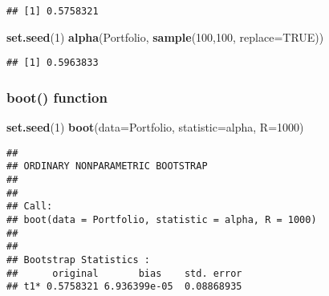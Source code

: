 \documentclass[]{article}
\newenvironment{Shaded}{\begin{snugshade}}{\end{snugshade}}
\newcommand{\KeywordTok}[1]{\textcolor[rgb]{0.13,0.29,0.53}{\textbf{#1}}}
\newcommand{\DataTypeTok}[1]{\textcolor[rgb]{0.13,0.29,0.53}{#1}}
\newcommand{\DecValTok}[1]{\textcolor[rgb]{0.00,0.00,0.81}{#1}}
\newcommand{\OtherTok}[1]{\textcolor[rgb]{0.56,0.35,0.01}{#1}}
\newcommand{\ControlFlowTok}[1]{\textcolor[rgb]{0.13,0.29,0.53}{\textbf{#1}}}
\newcommand{\OperatorTok}[1]{\textcolor[rgb]{0.81,0.36,0.00}{\textbf{#1}}}
\newcommand{\NormalTok}[1]{#1}
\begin{document}
\begin{Shaded}
\end{Shaded}

\begin{verbatim}
## [1] 0.5758321
\end{verbatim}

\begin{Shaded}
\begin{Highlighting}[]
\KeywordTok{set.seed}\NormalTok{(}\DecValTok{1}\NormalTok{)}
\KeywordTok{alpha}\NormalTok{(Portfolio, }\KeywordTok{sample}\NormalTok{(}\DecValTok{100}\NormalTok{,}\DecValTok{100}\NormalTok{, }\DataTypeTok{replace=}\OtherTok{TRUE}\NormalTok{))}
\end{Highlighting}
\end{Shaded}

\begin{verbatim}
## [1] 0.5963833
\end{verbatim}

\subsubsection{boot() function}\label{boot-function}

\begin{Shaded}
\begin{Highlighting}[]
\KeywordTok{set.seed}\NormalTok{(}\DecValTok{1}\NormalTok{)}
\KeywordTok{boot}\NormalTok{(}\DataTypeTok{data=}\NormalTok{Portfolio, }\DataTypeTok{statistic=}\NormalTok{alpha, }\DataTypeTok{R=}\DecValTok{1000}\NormalTok{)}
\end{Highlighting}
\end{Shaded}

\begin{verbatim}
## 
## ORDINARY NONPARAMETRIC BOOTSTRAP
## 
## 
## Call:
## boot(data = Portfolio, statistic = alpha, R = 1000)
## 
## 
## Bootstrap Statistics :
##      original       bias    std. error
## t1* 0.5758321 6.936399e-05  0.08868935
\end{verbatim}
\end{document}
